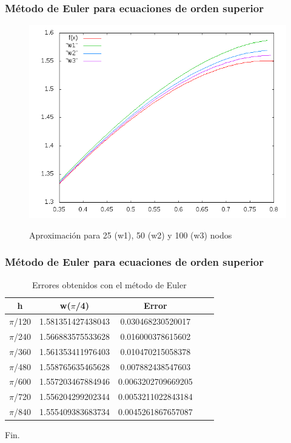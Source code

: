 \documentclass{beamer}
\begin{document}
\begin{frame}
	\frametitle{Método de Euler para ecuaciones de orden superior}

	\begin{figure}[H]
	\centering
	\includegraphics[scale=0.45]{img/grafica1.png}
	\label{figura1}
	\caption{Aproximación para 25 (w1), 50 (w2) y 100 (w3) nodos} 
	\end{figure}


\end{frame}


\begin{frame}
	\frametitle{Método de Euler para ecuaciones de orden superior}

    \begin{table}[H]
        \centering
        \setlength\extrarowheight{3pt}
        
        \begin{tabular}{|c|c|c|c|c}
            \hline
            \textbf{h} & {\textbf{w($\pi$/4)}} & \textbf{Error} \\ 
            \hline
                $\pi$/120 & 1.581351427438043 & 0.030468230520017\\
            \hline
                $\pi$/240 & 1.566883575533628 & 0.016000378615602\\
            \hline
                $\pi$/360 & 1.561353411976403 & 0.010470215058378\\
            \hline
                $\pi$/480 & 1.558765635465628 & 0.007882438547603\\
            \hline
                $\pi$/600 & 1.557203467884946 & 0.0063202709669205\\
            \hline
                $\pi$/720 &  1.556204299202344 & 0.0053211022843184\\
            \hline
                $\pi$/840 & 1.555409383683734 & 0.0045261867657087\\
            \hline
        \end{tabular}
        
        \caption{Errores obtenidos con el método de Euler}           
    \end{table}

\end{frame}

\begin{frame}
\Huge{\centerline{Fin.}}
\end{frame}

\end{document}
